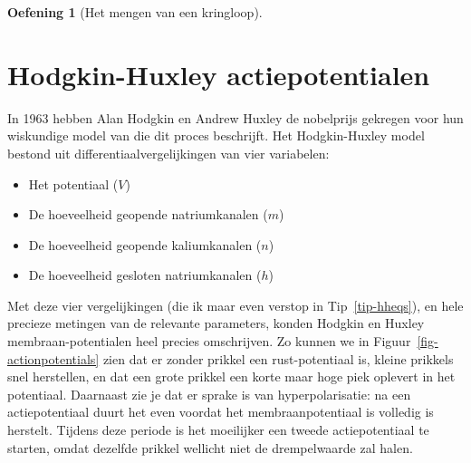 \documentclass[
  a4paper,
]{scrbook}
\providecommand{\tightlist}{%
  \setlength{\itemsep}{0pt}\setlength{\parskip}{0pt}}\usepackage{longtable,booktabs,array}
\theoremstyle{definition}
\newtheorem{exercise}{Oefening}[chapter]
\theoremstyle{remark}
\begin{document}
\begin{exercise}[Het mengen van een
kringloop]
\section{Hodgkin-Huxley
actiepotentialen}\label{hodgkin-huxley-actiepotentialen}

In 1963 hebben Alan Hodgkin en Andrew Huxley de nobelprijs gekregen voor
hun wiskundige model van die dit proces beschrijft. Het Hodgkin-Huxley
model bestond uit differentiaalvergelijkingen van vier variabelen:

\begin{itemize}
\tightlist
\item
  Het potentiaal (\(V\))
\item
  De hoeveelheid geopende natriumkanalen (\(m\))
\item
  De hoeveelheid geopende kaliumkanalen (\(n\))
\item
  De hoeveelheid gesloten natriumkanalen (\(h\))
\end{itemize}

Met deze vier vergelijkingen (die ik maar even verstop in
Tip~\ref{tip-hheqs}), en hele precieze metingen van de relevante
parameters, konden Hodgkin en Huxley membraan-potentialen heel precies
omschrijven. Zo kunnen we in Figuur~\ref{fig-actionpotentials} zien dat
er zonder prikkel een rust-potentiaal is, kleine prikkels snel
herstellen, en dat een grote prikkel een korte maar hoge piek oplevert
in het potentiaal. Daarnaast zie je dat er sprake is van
hyperpolarisatie: na een actiepotentiaal duurt het even voordat het
membraanpotentiaal is volledig is herstelt. Tijdens deze periode is het
moeilijker een tweede actiepotentiaal te starten, omdat dezelfde prikkel
wellicht niet de drempelwaarde zal halen.


\end{exercise}
\end{document}
